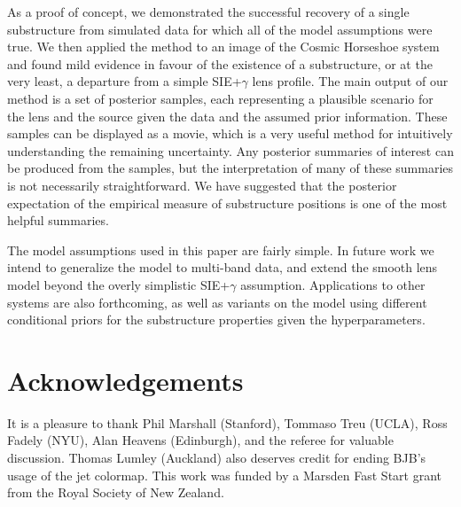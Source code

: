 \documentclass[useAMS,usenatbib]{mn2e}
\newcommand{\revisions}{\color{blue}}
\begin{document}
As a proof of concept, we demonstrated the successful recovery of a single
substructure from simulated data for which all of the model assumptions were
true. We then applied the method to an image of the Cosmic Horseshoe system
and found mild evidence in favour of the existence of a substructure, or at
the very least, a departure from a simple SIE+$\gamma$ lens profile. The
main output of our method is a set of posterior samples, each representing
a plausible scenario for the lens and the source given the data
and the assumed prior information. These samples can be displayed as a movie,
which is a very useful method for intuitively understanding the remaining
uncertainty. Any posterior summaries of interest can be
produced from the samples, but the interpretation of many of these summaries
is not necessarily straightforward. We have suggested that the
posterior expectation of the empirical measure of substructure positions is
one of the most helpful summaries.

The model assumptions used in this paper are fairly simple. In future work we
intend to generalize the model to multi-band data, and extend the
smooth lens model beyond the overly simplistic
SIE+$\gamma$ assumption. Applications
to other systems are also forthcoming, as well as variants on the model using
different conditional priors for the substructure properties given the
hyperparameters.

\section*{Acknowledgements}
It is a pleasure to thank Phil Marshall (Stanford), Tommaso Treu (UCLA),
Ross Fadely (NYU), Alan Heavens (Edinburgh), {\revisions and the referee}
for valuable discussion. Thomas Lumley (Auckland) also deserves credit for
ending BJB's usage of the jet colormap.
This work was funded by a Marsden Fast Start grant from the Royal Society of
New Zealand.
\end{document}
